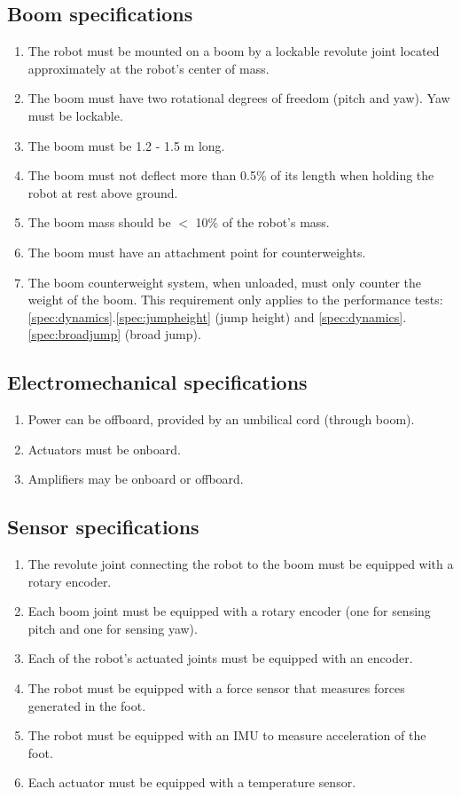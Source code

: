 \documentclass{report}
\begin{document}
\subsection{Boom specifications}\label{specs:boom}
	\begin{enumerate}
		\item The robot must be mounted on a boom by a lockable revolute joint located approximately at the robot's center of mass.
		\item The boom must have two rotational degrees of freedom (pitch and yaw). Yaw must be lockable.
		\item The boom must be 1.2 - 1.5 m long.
		\item The boom must not deflect more than 0.5\% of its length when holding the robot at rest above ground.
		\item The boom mass should be $<$ 10\% of the robot’s mass.
		\item The boom must have an attachment point for counterweights.
		\item The boom counterweight system, when unloaded, must only counter the weight of the boom. This requirement only applies to the performance tests: \ref{spec:dynamics}.\ref{spec:jumpheight} (jump height) and \ref{spec:dynamics}.\ref{spec:broadjump} (broad jump).
	\end{enumerate}
\subsection{Electromechanical specifications}
	\begin{enumerate}
		\item Power can be offboard, provided by an umbilical cord (through boom).
		\item Actuators must be onboard.
		\item Amplifiers may be onboard or offboard.
	\end{enumerate}
\subsection{Sensor specifications}
	\begin{enumerate}
		\item The revolute joint connecting the robot to the boom must be equipped with a rotary encoder.
		\item Each boom joint must be equipped with a rotary encoder (one for sensing pitch and one for sensing yaw).
		\item Each of the robot's actuated joints must be equipped with an encoder.
		\item The robot must be equipped with a force sensor that measures forces generated in the foot.
		\item The robot must be equipped with an IMU to measure acceleration of the foot.
		\item Each actuator must be equipped with a temperature sensor.
	\end{enumerate}
\end{document}
